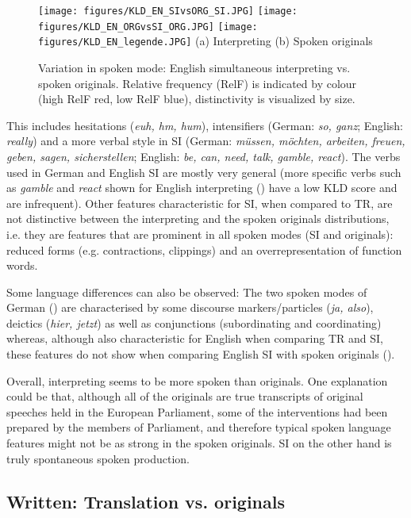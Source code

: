 \documentclass[output=paper,colorlinks,citecolor=brown]{langscibook}
\begin{document}
\begin{figure}
\texttt{[image: figures/KLD\_EN\_SIvsORG\_SI.JPG]}
\texttt{[image: figures/KLD\_EN\_ORGvsSI\_ORG.JPG]}
\texttt{[image: figures/KLD\_EN\_legende.JPG]}
(a) Interpreting  \hspace{2cm}  (b) Spoken originals
\caption{\label{fig: EN SI vs ORG} Variation in spoken mode: English simultaneous interpreting vs. spoken originals. Relative frequency (RelF) is indicated by colour (high RelF red, low RelF blue), distinctivity is visualized by size.}
\end{figure}

This includes hesitations (\textit{euh, hm, hum}), intensifiers (German: \textit{so, ganz}; English: \textit{really}) and a more verbal style in SI (German: \textit{müssen, möchten, arbeiten, freuen, geben, sagen, sicherstellen}; English: \textit{be, can, need, talk, gamble, react}). The verbs used in German and English SI are mostly very general (more specific verbs such as \textit{gamble} and \textit{react} shown for English interpreting () have a low KLD score and are infrequent). Other features characteristic for SI, when compared to TR, are not distinctive between the interpreting and the spoken originals distributions, i.e. they are features that are prominent in all spoken modes (SI and originals):  reduced forms (e.g. contractions, clippings) and an overrepresentation of function words.

Some language differences can also be observed: The two spoken modes of German () are characterised by some discourse markers/particles (\textit{ja, also}), deictics (\textit{hier, jetzt}) as well as conjunctions (subordinating and coordinating) whereas, although also characteristic for English when comparing TR and SI, these features do not show when comparing English SI with spoken originals ().

Overall, interpreting seems to be more spoken than originals. One explanation could be that, although all of the originals are true transcripts of original speeches held in the European Parliament, some of the interventions had been prepared by the members of Parliament, and therefore typical spoken language features might not be as strong in the spoken originals. SI on the other hand is truly spontaneous spoken production.


\subsection{Written: Translation vs. originals}\label{KLD written}
\end{document}
